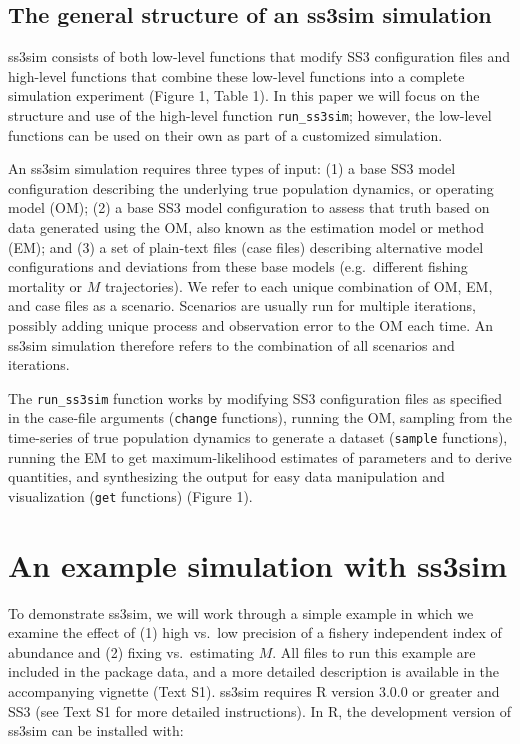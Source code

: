 \documentclass[10pt]{article}
\begin{document}
\subsection*{The general structure of an ss3sim simulation}

ss3sim consists of both low-level functions that modify SS3 configuration files and high-level functions that combine these low-level functions into a complete simulation experiment (Figure 1, Table 1). In this paper we will focus on the structure and use of the high-level function \texttt{run\_ss3sim}; however, the low-level functions can be used on their own as part of a customized simulation.

An ss3sim simulation requires three types of input: (1) a base SS3 model configuration describing the underlying true population dynamics, or operating model (OM); (2) a base SS3 model configuration to assess that truth based on data generated using the OM, also known as the estimation model or method (EM); and (3) a set of plain-text files (case files) describing alternative model configurations and deviations from these base models (e.g.~different fishing mortality or $M$ trajectories). We refer to each unique combination of OM, EM, and case files as a scenario. Scenarios are usually run for multiple iterations, possibly adding unique process and observation error to the OM each time. An ss3sim simulation therefore refers to the combination of all scenarios and iterations.

The \texttt{run\_ss3sim} function works by modifying SS3 configuration files as specified in the case-file arguments (\texttt{change} functions), running the OM, sampling from the time-series of true population dynamics to generate a dataset (\texttt{sample} functions), running the EM to get maximum-likelihood estimates of parameters and to derive quantities, and synthesizing the output for easy data manipulation and visualization (\texttt{get} functions) (Figure 1).

\section*{An example simulation with ss3sim}

To demonstrate ss3sim, we will work through a simple example in which we examine the effect of (1) high vs.~low precision of a fishery independent index of abundance and (2) fixing vs.~estimating $M$. All files to run this example are included in the package data, and a more detailed description is available in the accompanying vignette (Text S1). ss3sim requires R version 3.0.0 or greater and SS3 (see Text S1 for more detailed instructions). In R, the development version of ss3sim can be installed with:
\end{document}
